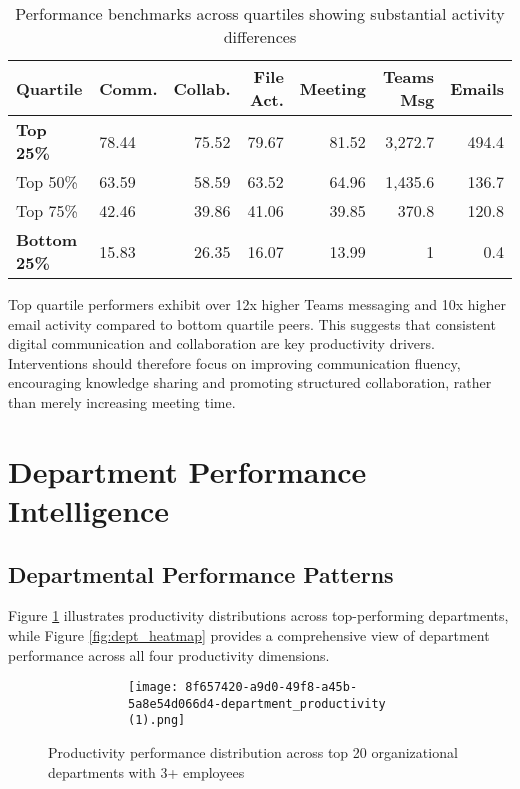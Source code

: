 \documentclass[12pt,a4paper]{article}
\begin{document}
\begin{table}[H]
\centering
\begin{tabularx}{\textwidth}{@{}lXrrrrr@{}}
\toprule
\textbf{\color{primaryBlue}Quartile} & \textbf{\color{primaryBlue}Comm.} & \textbf{\color{primaryBlue}Collab.} & \textbf{\color{primaryBlue}File Act.} & \textbf{\color{primaryBlue}Meeting} & \textbf{\color{primaryBlue}Teams Msg} & \textbf{\color{primaryBlue}Emails} \\
\midrule
\textbf{Top 25\%} & 78.44 & 75.52 & 79.67 & 81.52 & 3,272.7 & 494.4 \\
Top 50\% & 63.59 & 58.59 & 63.52 & 64.96 & 1,435.6 & 136.7 \\
Top 75\% & 42.46 & 39.86 & 41.06 & 39.85 & 370.8 & 120.8 \\
\textbf{Bottom 25\%} & 15.83 & 26.35 & 16.07 & 13.99 & 1 & 0.4 \\
\bottomrule
\end{tabularx}
\caption{Performance benchmarks across quartiles showing substantial activity differences}
\end{table}


Top quartile performers exhibit over 12x higher Teams messaging and 10x higher email activity compared to bottom quartile peers. This suggests that consistent digital communication and collaboration are key productivity drivers. Interventions should therefore focus on improving communication fluency, encouraging knowledge sharing and promoting structured collaboration, rather than merely increasing meeting time.




\newpage
\section{Department Performance Intelligence}

\subsection{Departmental Performance Patterns}

Figure \ref{fig:dept_productivity} illustrates productivity distributions across top-performing departments, while Figure \ref{fig:dept_heatmap} provides a comprehensive view of department performance across all four productivity dimensions.

\begin{figure}[H]
\centering
\begin{figure}
    \centering
    \begin{figure}
        \centering
        \texttt{[image: 8f657420-a9d0-49f8-a45b-5a8e54d066d4-department\_productivity (1).png]}
    \end{figure}
\end{figure}


\caption{Productivity performance distribution across top 20 organizational departments with 3+ employees}
\label{fig:dept_productivity}
\end{figure}
\end{document}
